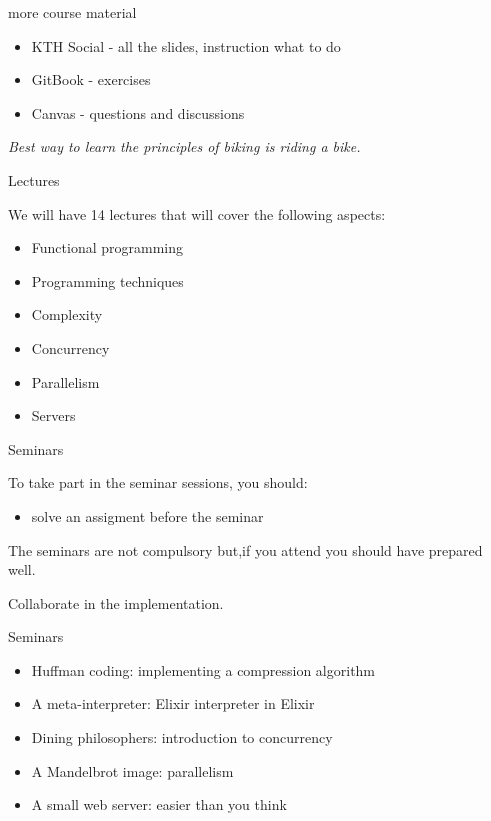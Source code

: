 \begin{frame}{more course material}

  \begin{itemize}
  \item KTH Social - all the slides, instruction what to do
  \item GitBook - exercises
  \item Canvas - questions and discussions
  \end{itemize}  

  \vspace{20pt}\hspace{40pt} {\em Best way to learn the principles of biking is riding a bike.}
  
  
\end{frame}


\begin{frame}{Lectures}

   We will have 14 lectures that will cover the following aspects:


  \begin{itemize}
    \item Functional programming
\pause
    \item Programming techniques
\pause
    \item Complexity 
\pause
    \item Concurrency 
\pause
    \item Parallelism
\pause
    \item Servers
  \end{itemize}
\end{frame}


\begin{frame}{Seminars}

  To take part in the seminar sessions, you should:
  \begin{itemize}
  \item solve an assigment before the seminar 
  \end{itemize}

  \pause \vspace{20pt}
  The seminars are not compulsory but,\pause if you attend you should have prepared well. 

  \pause \vspace{20pt}
  Collaborate in the implementation.

\end{frame}

\begin{frame}{Seminars}
  \begin{itemize}
    \item Huffman coding: implementing a compression algorithm \pause
    \item A meta-interpreter: Elixir interpreter in Elixir \pause
    \item Dining philosophers: introduction to concurrency \pause
    \item A Mandelbrot image: parallelism \pause
    \item A small web server: easier than you think
  \end{itemize}
\end{frame}

